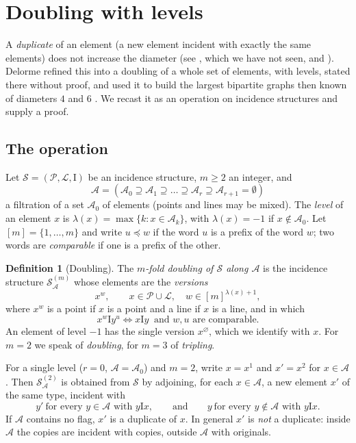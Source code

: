 \documentclass[11pt]{amsart}
\theoremstyle{definition}
\newtheorem{definition}[theorem]{Definition}
\theoremstyle{remark}
\newcommand{\cS}{\mathcal{S}}
\newcommand{\cP}{\mathcal{P}}
\newcommand{\cL}{\mathcal{L}}
\newcommand{\cA}{\mathcal{A}}
\newcommand{\I}{\mathrel{\mathrm{I}}}
\newcommand{\Dbl}[2]{{#1}^{(#2)}_{\cA}}
\begin{document}
\section{Doubling with levels}\label{sec:doubling}

A \emph{duplicate} of an element (a new element incident with exactly the same elements) does not increase the diameter (see \cite{DF84}, which we have not seen, and \cite[\S7]{D85a}). Delorme \cite[\S7]{D85a} refined this into a doubling of a whole set of elements, with levels, stated there without proof, and used it to build the largest bipartite graphs then known of diameters $4$ and $6$ \cite[\S8(a),(b)]{D85a}. We recast it as an operation on incidence structures and supply a proof.

\subsection{The operation}
Let $\cS=(\cP,\cL,\I)$ be an incidence structure, $m\ge2$ an integer, and
\[
\cA=(\cA_0\supseteq\cA_1\supseteq\dots\supseteq\cA_r\supseteq\cA_{r+1}=\emptyset)
\]
a filtration of a set $\cA_0$ of elements (points and lines may be mixed). The \emph{level} of an element $x$ is $\lambda(x)=\max\{k: x\in\cA_k\}$, with $\lambda(x)=-1$ if $x\notin\cA_0$. Let $[m]=\{1,\dots,m\}$ and write $u\preceq w$ if the word $u$ is a prefix of the word $w$; two words are \emph{comparable} if one is a prefix of the other.

\begin{definition}[Doubling]\label{def:doubling}
The \emph{$m$-fold doubling of $\cS$ along $\cA$} is the incidence structure $\Dbl{\cS}{m}$ whose elements are the \emph{versions}
\[
x^w,\qquad x\in\cP\cup\cL,\quad w\in[m]^{\lambda(x)+1},
\]
where $x^w$ is a point if $x$ is a point and a line if $x$ is a line, and in which
\[
x^w\I y^u\iff x\I y\ \text{ and $w,u$ are comparable.}
\]
An element of level $-1$ has the single version $x^\varnothing$, which we identify with $x$. For $m=2$ we speak of \emph{doubling}, for $m=3$ of \emph{tripling}.
\end{definition}

For a single level ($r=0$, $\cA=\cA_0$) and $m=2$, write $x=x^1$ and $x'=x^2$ for $x\in\cA$. Then $\Dbl{\cS}{2}$ is obtained from $\cS$ by adjoining, for each $x\in\cA$, a new element $x'$ of the same type, incident with
\[
y'\ \text{for every } y\in\cA \text{ with } y\I x,\qquad\text{and}\qquad y\ \text{for every } y\notin\cA \text{ with } y\I x.
\]
If $\cA$ contains no flag, $x'$ is a duplicate of $x$. In general $x'$ is \emph{not} a duplicate: inside $\cA$ the copies are incident with copies, outside $\cA$ with originals.
\end{document}
